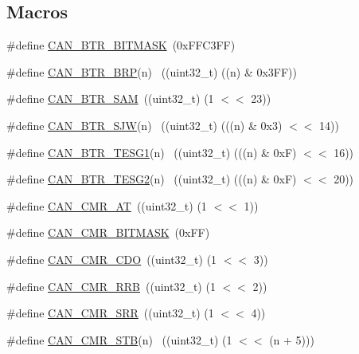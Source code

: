 \subsection*{Macros}
\begin{DoxyCompactItemize}
\item 
\#define \hyperlink{group__CAN__17XX__40XX_ga4e724f70048e25e40f190539157751e5}{C\+A\+N\+\_\+\+B\+T\+R\+\_\+\+B\+I\+T\+M\+A\+SK}~(0x\+F\+F\+C3\+F\+F)
\item 
\#define \hyperlink{group__CAN__17XX__40XX_gabee9c6785426a4d3c14d12947642daa2}{C\+A\+N\+\_\+\+B\+T\+R\+\_\+\+B\+RP}(n)        ~((uint32\+\_\+t) ((n) \& 0x3\+F\+F))
\item 
\#define \hyperlink{group__CAN__17XX__40XX_ga91d6a3f10153591c0e9b0f75b0020db7}{C\+A\+N\+\_\+\+B\+T\+R\+\_\+\+S\+AM}~((uint32\+\_\+t) (1 $<$$<$ 23))
\item 
\#define \hyperlink{group__CAN__17XX__40XX_ga5e537b78fff7d1568d0f8f3bbff04011}{C\+A\+N\+\_\+\+B\+T\+R\+\_\+\+S\+JW}(n)        ~((uint32\+\_\+t) (((n) \& 0x3) $<$$<$ 14))
\item 
\#define \hyperlink{group__CAN__17XX__40XX_ga3d8bc3210bfc1044cd42cd7c42cbd87f}{C\+A\+N\+\_\+\+B\+T\+R\+\_\+\+T\+E\+S\+G1}(n)    ~((uint32\+\_\+t) (((n) \& 0x\+F) $<$$<$ 16))
\item 
\#define \hyperlink{group__CAN__17XX__40XX_gaee67259b9c215b10dc6d35d2d482234d}{C\+A\+N\+\_\+\+B\+T\+R\+\_\+\+T\+E\+S\+G2}(n)    ~((uint32\+\_\+t) (((n) \& 0x\+F) $<$$<$ 20))
\item 
\#define \hyperlink{group__CAN__17XX__40XX_ga2c62ebf606fecb5f3a891642f5bc25d6}{C\+A\+N\+\_\+\+C\+M\+R\+\_\+\+AT}~((uint32\+\_\+t) (1 $<$$<$ 1))
\item 
\#define \hyperlink{group__CAN__17XX__40XX_ga5e4f3e4201311f127d98fff1b8eb2d3f}{C\+A\+N\+\_\+\+C\+M\+R\+\_\+\+B\+I\+T\+M\+A\+SK}~(0x\+F\+F)
\item 
\#define \hyperlink{group__CAN__17XX__40XX_ga867ee74878ca3d86ec6d0cd2e25e15ac}{C\+A\+N\+\_\+\+C\+M\+R\+\_\+\+C\+DO}~((uint32\+\_\+t) (1 $<$$<$ 3))
\item 
\#define \hyperlink{group__CAN__17XX__40XX_gaca5b99941b4a44bf4fc0233cd740db2c}{C\+A\+N\+\_\+\+C\+M\+R\+\_\+\+R\+RB}~((uint32\+\_\+t) (1 $<$$<$ 2))
\item 
\#define \hyperlink{group__CAN__17XX__40XX_gadf85238951b64fd26cc0efcb0e8508ec}{C\+A\+N\+\_\+\+C\+M\+R\+\_\+\+S\+RR}~((uint32\+\_\+t) (1 $<$$<$ 4))
\item 
\#define \hyperlink{group__CAN__17XX__40XX_ga6ae73f935e1bba852e2e34be6e5240d4}{C\+A\+N\+\_\+\+C\+M\+R\+\_\+\+S\+TB}(n)          ~((uint32\+\_\+t) (1 $<$$<$ (n + 5)))
$$
\end{DoxyCompactItemize}
